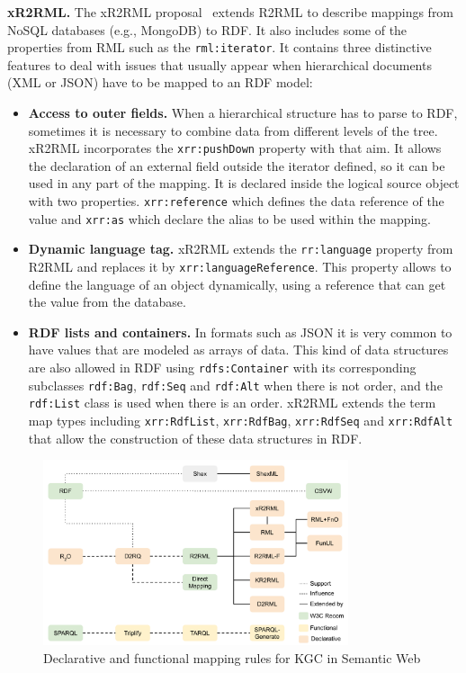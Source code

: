 \noindent\textbf{xR2RML.} The xR2RML proposal~\citep{michel2015translation} extends R2RML to describe mappings from NoSQL databases (e.g., MongoDB) to RDF. It also includes some of the properties from RML such as the \texttt{rml:iterator}. It contains three distinctive features to deal with issues that usually appear when hierarchical documents (XML or JSON) have to be mapped to an RDF model:
\begin{itemize}
    \item \textbf{Access to outer fields.} When a hierarchical structure has to parse to RDF, sometimes it is necessary to combine data from different levels of the tree. xR2RML incorporates the \texttt{xrr:pushDown} property with that aim. It allows the declaration of an external field outside the iterator defined, so it can be used in any part of the mapping. It is declared inside the logical source object with two properties. \texttt{xrr:reference} which defines the data reference of the value and \texttt{xrr:as} which declare the alias to be used within the mapping.  
    \item \textbf{Dynamic language tag.} xR2RML extends the \texttt{rr:language} property from R2RML and replaces it by \texttt{xrr:languageReference}. This property allows to define the language of an object dynamically, using a reference that can get the value from the database.
    \item \textbf{RDF lists and containers.} In formats such as JSON it is very common to have values that are modeled as arrays of data. This kind of data structures are also allowed in RDF using \texttt{rdfs:Container} with its corresponding subclasses \texttt{rdf:Bag}, \texttt{rdf:Seq} and \texttt{rdf:Alt} when there is not order, and the \texttt{rdf:List} class is used when there is an order. xR2RML extends the term map types including \texttt{xrr:RdfList}, \texttt{xrr:RdfBag}, \texttt{xrr:RdfSeq} and \texttt{xrr:RdfAlt} that allow the construction of these data structures in RDF.
\end{itemize}

\begin{figure}[!t]
\centering
\includegraphics[angle=90,width=0.8\textwidth]{figures/state-of-the-art/mapping_story.pdf}
\caption{Declarative and functional mapping rules for KGC in Semantic Web}
\label{fig:soa_mapping_rules_story}
\end{figure}

